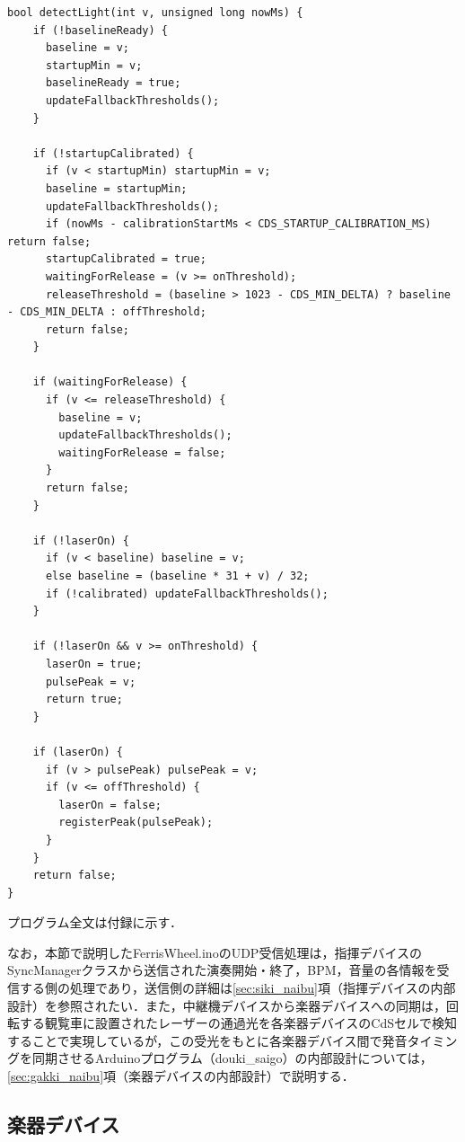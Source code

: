 \begin{lstlisting}[caption={LaserDetector::detectLight関数}, label={lst:laser_detectlight}]
bool detectLight(int v, unsigned long nowMs) {
    if (!baselineReady) {
      baseline = v;
      startupMin = v;
      baselineReady = true;
      updateFallbackThresholds();
    }

    if (!startupCalibrated) {
      if (v < startupMin) startupMin = v;
      baseline = startupMin;
      updateFallbackThresholds();
      if (nowMs - calibrationStartMs < CDS_STARTUP_CALIBRATION_MS) return false;
      startupCalibrated = true;
      waitingForRelease = (v >= onThreshold);
      releaseThreshold = (baseline > 1023 - CDS_MIN_DELTA) ? baseline - CDS_MIN_DELTA : offThreshold;
      return false;
    }

    if (waitingForRelease) {
      if (v <= releaseThreshold) {
        baseline = v;
        updateFallbackThresholds();
        waitingForRelease = false;
      }
      return false;
    }

    if (!laserOn) {
      if (v < baseline) baseline = v;
      else baseline = (baseline * 31 + v) / 32;
      if (!calibrated) updateFallbackThresholds();
    }

    if (!laserOn && v >= onThreshold) {
      laserOn = true;
      pulsePeak = v;
      return true;
    }

    if (laserOn) {
      if (v > pulsePeak) pulsePeak = v;
      if (v <= offThreshold) {
        laserOn = false;
        registerPeak(pulsePeak);
      }
    }
    return false;
}
\end{lstlisting}

プログラム全文は付録に示す．

なお，本節で説明したFerrisWheel.inoのUDP受信処理は，指揮デバイスのSyncManagerクラスから送信された演奏開始・終了，BPM，音量の各情報を受信する側の処理であり，送信側の詳細は\ref{sec:siki_naibu}項（指揮デバイスの内部設計）を参照されたい．また，中継機デバイスから楽器デバイスへの同期は，回転する観覧車に設置されたレーザーの通過光を各楽器デバイスのCdSセルで検知することで実現しているが，この受光をもとに各楽器デバイス間で発音タイミングを同期させるArduinoプログラム（douki\_saigo）の内部設計については，\ref{sec:gakki_naibu}項（楽器デバイスの内部設計）で説明する．

\fi




\subsection{楽器デバイス}

